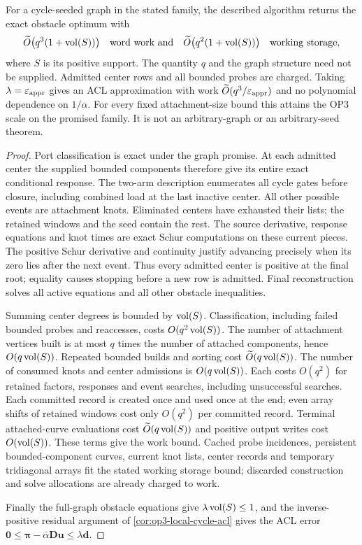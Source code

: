 \begin{theorem}
\label{thm:op3-bounded-attachments}
For a cycle-seeded graph in the stated family, the described algorithm
returns the exact obstacle optimum with
\begin{equation}
 \widetilde O\bigl(q^3(1+\operatorname{vol}(S))\bigr)
 \quad\text{word work and}\quad
 \widetilde O\bigl(q^2(1+\operatorname{vol}(S))\bigr)
 \quad\text{working storage},
 \label{eq:op3-bounded-attachment-work}
\end{equation}
where $S$ is its positive support. The quantity $q$ and the graph structure
need not be supplied. Admitted center rows and all bounded probes are
charged. Taking $\lambda=\varepsilon_{\mathrm{appr}}$ gives an ACL approximation with work
$\widetilde O(q^3/\varepsilon_{\mathrm{appr}})$ and no polynomial dependence on $1/\alpha$.
For every fixed attachment-size bound this attains the OP3 scale on the
promised family. It is not an arbitrary-graph or an arbitrary-seed theorem.
\end{theorem}
\begin{proof}
Port classification is exact under the graph promise. At each admitted
center the supplied bounded components therefore give its entire exact
conditional response. The two-arm description enumerates all cycle gates
before closure, including combined load at the last inactive center.
All other possible events are attachment knots. Eliminated centers have
exhausted their lists; the retained windows and the seed contain the rest.
The source derivative, response equations and knot times are exact Schur
computations on these current pieces. The positive Schur derivative and
continuity justify advancing precisely when its zero lies after the next
event. Thus every admitted center is positive at the final root; equality
causes stopping before a new row is admitted. Final reconstruction solves
all active equations and all other obstacle inequalities.

Summing center degrees is bounded by $\operatorname{vol}(S)$. Classification, including
failed bounded probes and reaccesses, costs $O(q^2\operatorname{vol}(S))$. The number
of attachment vertices built is at most $q$ times the number of attached
components, hence $O(q\operatorname{vol}(S))$. Repeated bounded builds and sorting cost
$\widetilde O(q\operatorname{vol}(S))$. The number of consumed knots and center
admissions is $O(q\operatorname{vol}(S))$. Each costs $O(q^2)$ for retained factors,
responses and event searches, including unsuccessful searches. Each
committed record is created once and used once at the end; even array
shifts of retained windows cost only $O(q^2)$ per committed record.
Terminal attached-curve evaluations cost
$\widetilde O(q\operatorname{vol}(S))$ and positive output writes cost $O(\operatorname{vol}(S))$.
These terms give the work bound. Cached probe incidences, persistent
bounded-component curves, current knot lists, center records and temporary
tridiagonal arrays fit the stated working storage bound; discarded
construction and solve allocations are already charged to work.

Finally the full-graph obstacle equations give
$\lambda\operatorname{vol}(S)\leq1$, and the inverse-positive residual argument of
\cref{cor:op3-local-cycle-acl} gives the ACL error
$\bm0\leq\bm\pi-\bar\alpha\bm D\bm u\leq\lambda\bm d$.
\end{proof}

